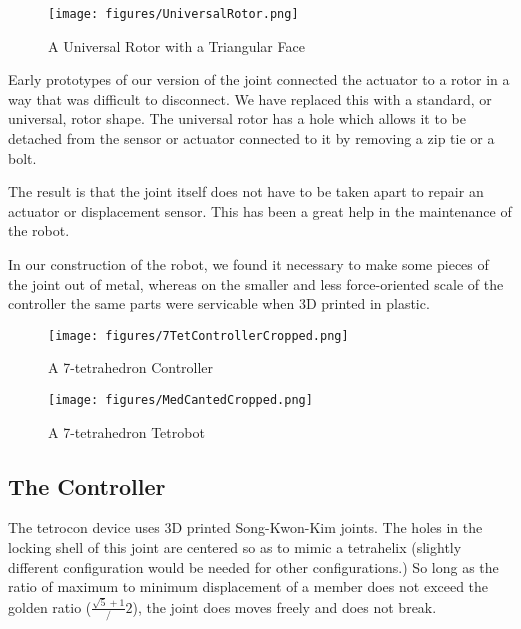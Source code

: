 \documentclass[conference]{article}
\begin{document}
 \begin{figure}
  \centering
  \texttt{[image: figures/UniversalRotor.png]}
    \caption[A Universal Rotor with a Triangular Face]{A Universal Rotor with a Triangular Face}
      \label{fig:UniversalController}
\end{figure}

 Early prototypes of our version of the joint connected the actuator to a rotor in a way
 that was difficult to disconnect. We have replaced this with a standard, or universal,
 rotor shape. The universal rotor has a hole which allows it to be detached from the
 sensor or actuator connected to it by removing a zip tie or a bolt.

 The result is that the joint itself does not have to be taken apart to repair an actuator
 or displacement sensor.
 This has been a great help in the maintenance of the robot.

 In our construction of the robot, we found it necessary to make some pieces of the joint
 out of metal, whereas on the smaller and less force-oriented scale of the controller the
 same parts were servicable when 3D printed in plastic.






\begin{figure}
  \centering
  \texttt{[image: figures/7TetControllerCropped.png]}
    \caption[A 7-tetrahedron Controller]{A 7-tetrahedron Controller}
      \label{fig:7tetcontroller}
\end{figure}

\begin{figure}
  \centering
  \texttt{[image: figures/MedCantedCropped.png]}
    \caption[A 7-tetrahedron Robot]{A 7-tetrahedron Tetrobot}
      \label{fig:7tetrobot}
\end{figure}



 \subsection{The Controller}

 The tetrocon device uses 3D printed Song-Kwon-Kim joints. The holes in
 the locking shell of this joint are centered so as to mimic a tetrahelix
 (slightly different configuration would be needed for other configurations.)
 So long as the ratio of maximum to minimum displacement of a member does not
 exceed the golden ratio ($\frac{\sqrt{5} + 1}/2$), the joint does moves
 freely and does not break.
\end{document}
